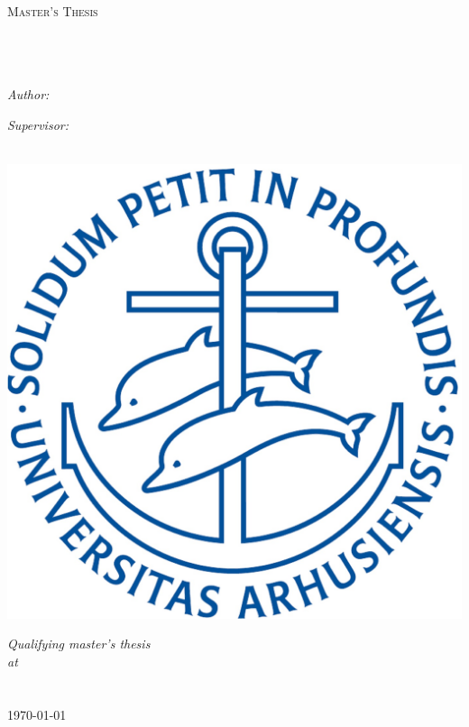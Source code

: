 \documentclass[11pt, twoside]{Thesis} %
\begin{document}
\begin{titlepage}
\begin{center}

\textsc{\LARGE \univname}\\[1.5cm] %
\textsc{\Large Master's Thesis}\\[0.5cm] %

\HRule \\[0.4cm] %
{\huge \bfseries \ttitle}\\[0.4cm] %
\HRule \\[1.5cm] %
 
\begin{minipage}{0.4\textwidth}
\begin{flushleft} \large
\emph{Author:}\\
{\authornames} %
\end{flushleft}
\end{minipage}
\begin{minipage}{0.4\textwidth}
\begin{flushright} \large
\emph{Supervisor:} \\
{\supname} %
\end{flushright}
\end{minipage}\\[0cm]
\vspace{3cm}
\includegraphics[width=0.4\columnwidth]{AU.jpg} 
 
\large \textit{Qualifying master's thesis}\\[0.1cm] %
\textit{at}\\[0.2cm]
\deptname \\ \facname \\[1cm] %


 
{\large \today} %

 
\vfill
\end{center}

\end{titlepage}
\end{document}
